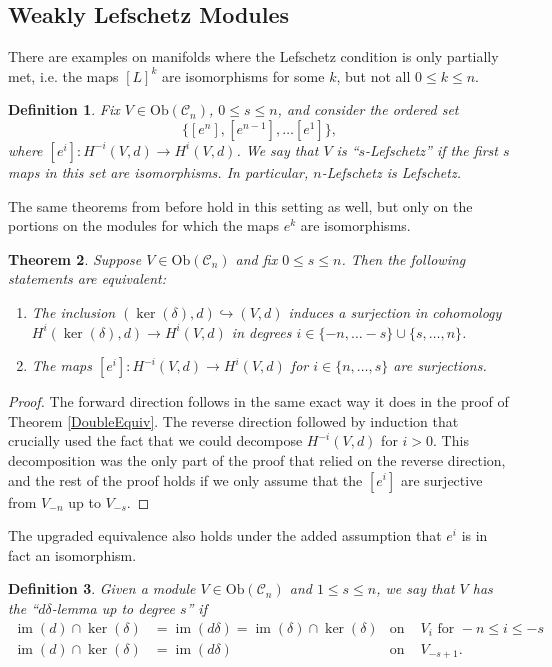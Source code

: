 \documentclass{amsart}
\newcommand{\ra}{\rightarrow}
\newtheorem{theorem}{Theorem}
\newtheorem{definition}[theorem]{Definition}
\theoremstyle{definition}
\DeclareMathOperator{\im}{im}
\begin{document}
\subsection{Weakly Lefschetz Modules}\label{Weak}
There are examples on manifolds where the Lefschetz condition is only partially met, i.e. the maps $[L]^k$ are  isomorphisms for some $k$, but not all $ 0 \leq k \leq n$.
\begin{definition}
    Fix $V \in \mathrm{Ob}(\mathscr{C}_n)$, $0 \leq s \leq n$, and consider the ordered set
    \begin{equation*}
        \{[e^n], [e^{n-1}], \dots [e^1] \},
    \end{equation*}
    where $[e^i]:H^{-i}(V,d) \ra H^i(V,d)$. We say that $V$ is ``$s$-Lefschetz'' if the first $s$ maps in this set are isomorphisms. In particular, $n$-Lefschetz is Lefschetz.
\end{definition}
The same theorems from before hold in this setting as well, but only on the portions on the modules for which the maps $e^k$ are isomorphisms. 
\begin{theorem}
      Suppose $V \in \mathrm{Ob}(\mathscr{C}_n)$ and fix $0 \leq s \leq n$. Then the following statements are equivalent:
    \begin{enumerate}
        \item The inclusion $(\ker(\delta),d) \hookrightarrow (V,d)$ induces a surjection in cohomology $H^i(\ker(\delta),d) \ra H^i(V,d)$ in degrees $i \in \{-n, \dots-s\} \cup \{s ,\dots, n\}$.
        \item The maps $[e^i]:H^{-i}(V,d) \ra H^i(V,d)$ for $i \in  \{n, \dots ,s\}$ are surjections.
    \end{enumerate}
\end{theorem}
\begin{proof}
    The forward direction follows in the same exact way it does in the proof of Theorem \ref{DoubleEquiv}. The reverse direction followed by induction that crucially used the fact that we could decompose $H^{-i}(V,d)$ for $i>0$. This decomposition was the only part of the proof that relied on the reverse direction, and the rest of the proof holds if we only assume that the $[e^i]$ are surjective from $V_{-n}$ up to $V_{-s}$.
\end{proof}
The upgraded equivalence also holds under the added assumption that $e^i$ is in fact an isomorphism.
\begin{definition}
    Given a module $V \in \mathrm{Ob}(\mathscr{C}_n)$ and $1 \leq s \leq n$, we say that $V$ has the ``$d\delta$-lemma up to degree $s$'' if 
    \begin{align*}
        \im(d) \cap \ker(\delta)&=\im (d \delta)= \im(\delta) \cap \ker(\delta) & \text{on } &V_i \text{ for } -n \leq i \leq -s \\
        \im(d) \cap \ker(\delta) &= \im(d\delta) & \text{on }& V_{-s+1}.
    \end{align*}
\end{definition}
\end{document}
